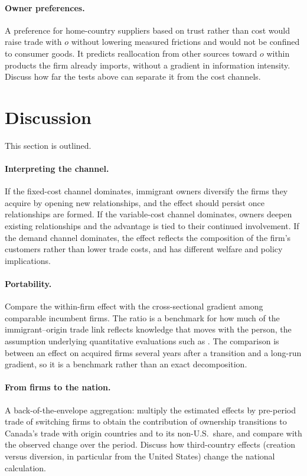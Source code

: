 \documentclass[12pt]{article}
\theoremstyle{remark}
\newcommand{\planned}[1]{\textcolor{OliveGreen}{#1}}
\begin{document}
\paragraph{Owner preferences.} \planned{A preference for home-country suppliers
based on trust rather than cost would raise trade with $o$ without lowering
measured frictions and would not be confined to consumer goods. It predicts
reallocation from other sources toward $o$ within products the firm already
imports, without a gradient in information intensity. Discuss how far the
tests above can separate it from the cost channels.}

\section{Discussion}
\label{sec:discussion}

\planned{This section is outlined.}

\paragraph{Interpreting the channel.} \planned{If the fixed-cost channel
dominates, immigrant owners diversify the firms they acquire by opening new
relationships, and the effect should persist once relationships are formed.
If the variable-cost channel dominates, owners deepen existing relationships
and the advantage is tied to their continued involvement. If the demand
channel dominates, the effect reflects the composition of the firm's
customers rather than lower trade costs, and has different welfare and
policy implications.}

\paragraph{Portability.} \planned{Compare the within-firm effect with the
cross-sectional gradient among comparable incumbent firms. The ratio is a
benchmark for how much of the immigrant--origin trade link reflects knowledge
that moves with the person, the assumption underlying quantitative
evaluations such as \citet{chikissaygin2026}. The comparison is between an
effect on acquired firms several years after a transition and a long-run
gradient, so it is a benchmark rather than an exact decomposition.}

\paragraph{From firms to the nation.} \planned{A back-of-the-envelope
aggregation: multiply the estimated effects by pre-period trade of switching
firms to obtain the contribution of ownership transitions to Canada's trade
with origin countries and to its non-U.S.\ share, and compare with the
observed change over the period. Discuss how third-country effects
(creation versus diversion, in particular from the United States) change
the national calculation.}
\end{document}
